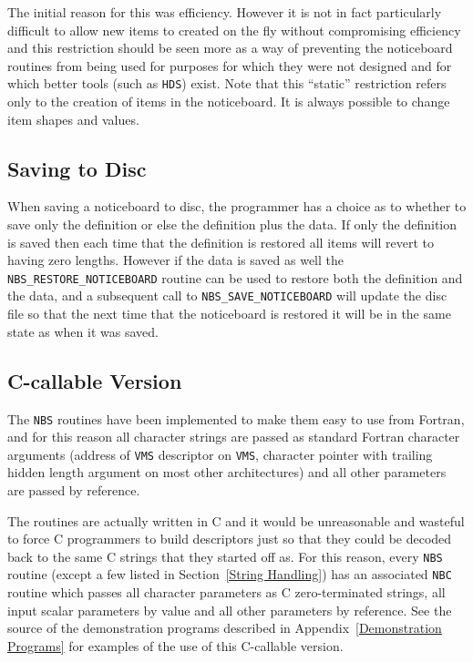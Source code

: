       The initial reason for this was efficiency. However it is not in fact
      particularly difficult to allow new items to created on the fly without
      compromising efficiency and this restriction should be seen more as a way
      of preventing the noticeboard routines from being used for purposes for
      which they were not designed and for which better tools (such as
      {\tt HDS}) exist. Note that this ``static'' restriction refers only to  
      the creation of
      items in the noticeboard. It is always possible to change item shapes and
      values.

      \subsection {Saving to Disc} When saving a noticeboard to disc, the
      programmer has a choice as to whether to save only the definition
      or else the definition plus the data. If only the definition is saved
      then each time that the definition is restored
      all items will revert to having zero lengths. However if the data
      is saved as well the {\tt NBS\_RESTORE\_NOTICEBOARD} routine can be used
      to restore both the definition and the data, and a subsequent call
      to {\tt NBS\_SAVE\_NOTICEBOARD} will update the disc file so that
      the next
      time that the noticeboard is restored it will be in the same state
      as when it was saved.

      \subsection {C-callable Version} The {\tt NBS} routines have been %
      implemented to make them easy to use from Fortran, and for this 
      reason all character strings are passed as standard Fortran character
      arguments (address of {\tt VMS} descriptor on {\tt VMS}, character 
      pointer with trailing hidden length argument on most other architectures)
      and all other parameters are passed by reference. 

      The routines are actually written in C and it
      would be unreasonable and wasteful to force C programmers to build
      descriptors just so that they could be decoded back to the same C strings
      that they started off as. For this reason, every {\tt NBS} routine %
(except a few listed in Section~\ref{String Handling}) has an
      associated {\tt NBC} routine which passes all character parameters %
as C
      zero-terminated strings, all input scalar parameters by value and all
      other parameters by reference. See the source of the demonstration
      programs described in Appendix~\ref {Demonstration Programs} for examples
      of the use of this C-callable version.

